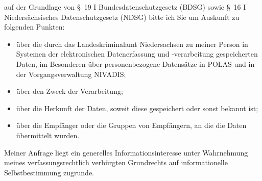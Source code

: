 auf der Grundlage von §~19 I Bundesdatenschutzgesetz (BDSG) sowie
§~16 I Niedersächsisches Datenschutzgesetz (NDSG) bitte ich Sie um Auskunft zu
folgenden Punkten:

\begin{itemize}
  \item über die durch das Landeskriminalamt Niedersachsen zu meiner Person in
  Systemen der elektronischen Datenerfassung und -verarbeitung gespeicherten Daten,
  im Besonderen über personenbezogene Datensätze in POLAS und in der Vorgangsverwaltung
  NIVADIS;

  \item über den Zweck der Verarbeitung;

  \item über die Herkunft der Daten, soweit diese gespeichert oder sonst bekannt ist;

  \item über die Empfänger oder die Gruppen von Empfängern, an die die Daten übermittelt wurden.
\end{itemize}

Meiner Anfrage liegt ein generelles Informationsinteresse unter Wahrnehmung
meines verfassungsrechtlich verbürgten Grundrechts auf informationelle
Selbstbestimmung zugrunde.
